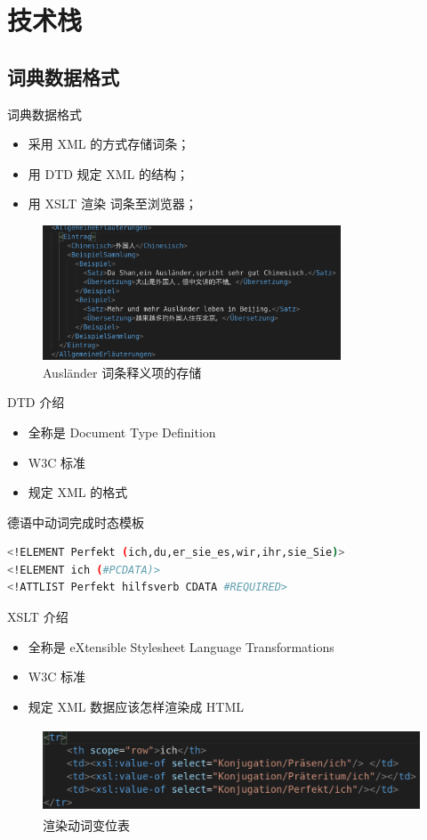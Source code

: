 \documentclass[notheorems,xetex]{beamer}
\begin{document}
\section{技术栈}
\frame{\tableofcontents[currentsection]}
\subsection{词典数据格式}
\begin{frame}{词典数据格式}
\begin{itemize}
\item 采用 XML 的方式存储词条；
\item 用 DTD 规定 XML 的结构；
\item 用 XSLT 渲染 词条至浏览器；
\end{itemize}
\begin{figure}
	\includegraphics[height=4cm]{xml.png}
	\caption{Ausländer 词条释义项的存储}
\end{figure}

\end{frame}
\begin{frame}[fragile]{DTD 介绍}
\begin{itemize}
	\item 全称是 Document Type Definition
	\item W3C 标准
	\item 规定 XML 的格式
\end{itemize}
\begin{block}{德语中动词完成时态模板}
\begin{lstlisting}[language=bash]
<!ELEMENT Perfekt (ich,du,er_sie_es,wir,ihr,sie_Sie)>
<!ELEMENT ich (#PCDATA)>
<!ATTLIST Perfekt hilfsverb CDATA #REQUIRED>
\end{lstlisting}
\end{block}
\end{frame}
\begin{frame}{XSLT 介绍}
\begin{itemize}
	\item 全称是 eXtensible Stylesheet Language Transformations
	\item W3C 标准
	\item 规定 XML 数据应该怎样渲染成 HTML
\end{itemize}
\begin{figure}
	\centering
	\includegraphics[height=2.5cm]{conjugation.png}
	\caption{渲染动词变位表}
\end{figure}
\end{frame}
\end{document}
